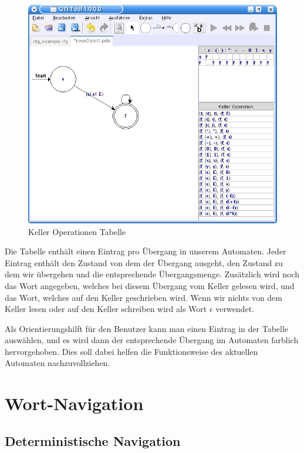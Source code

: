 \begin{figure}[h!]
\begin{center}
\includegraphics[width=12cm]{../images/stack_operation_table.png}
\caption{Keller Operationen Tabelle}
\end{center}
\end{figure}

Die Tabelle enthält einen Eintrag pro Übergang in unserem Automaten. Jeder
Eintrag enthält den Zustand von dem der Übergang ausgeht, den Zustand zu dem
wir übergehen und die entsprechende Übergangsmenge. Zusätzlich wird noch
das Wort angegeben, welches bei diesem Übergang vom Keller gelesen wird, und
das Wort, welches auf den Keller geschrieben wird. Wenn wir nichts von dem
Keller lesen oder auf den Keller schreiben wird als Wort $\epsilon$
verwendet.\vspace{10pt} 

Als Orientierungshilft für den Benutzer kann man einen Eintrag in der Tabelle
auswählen, und es wird dann der entsprechende Übergang im Automaten farblich
hervorgehoben. Dies soll dabei helfen die Funktionsweise des aktuellen
Automaten nachzuvollziehen.\vspace{10pt}


\section{Wort-Navigation}\label{wordNavigation}


\subsection{Deterministische Navigation}

